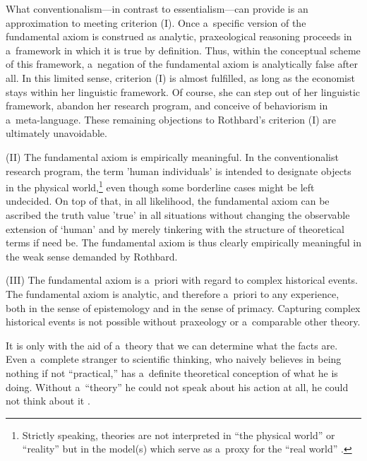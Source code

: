 What conventionalism---in contrast to essentialism---can provide is an approximation to meeting criterion (I). Once a~specific version of the fundamental axiom is construed as analytic, praxeological reasoning proceeds in a~framework in which it is true by definition. Thus, within the conceptual scheme of this framework, a~negation of the fundamental axiom is analytically false after all. In this limited sense, criterion (I) is almost fulfilled, as long as the economist stays within her linguistic framework. Of course, she can step out of her linguistic framework, abandon her research program, and conceive of behaviorism in a~meta-language. These remaining objections to Rothbard's criterion (I) are ultimately unavoidable.



(II) The fundamental axiom is empirically meaningful. In the conventionalist research program, the term 'human individuals' is intended to designate objects in the physical world,\footnote{Strictly speaking, theories are not interpreted in ``the physical world'' or ``reality'' but in the model(s) which serve as a~proxy for the ``real world'' 
\parencites[cf.][]{linsbichler_ultra-refined_2023}[][]{przelecki_logic_1969}.%
} even though some borderline cases might be left undecided. On top of that, in all likelihood, the fundamental axiom can be ascribed the truth value 'true' in all situations without changing the observable extension of ‘human' and by merely tinkering with the structure of theoretical terms if need be. The fundamental axiom is thus clearly empirically meaningful in the weak sense demanded by Rothbard.



(III) The fundamental axiom is a~priori with regard to complex historical events. The fundamental axiom is analytic, and therefore a~priori to any experience, both in the sense of epistemology and in the sense of primacy. Capturing complex historical events is not possible without praxeology or a~comparable other theory.



It is only with the aid of a~theory that we can determine what the facts are. Even a~complete stranger to scientific thinking, who naively believes in being nothing if not ``practical,'' has a~definite theoretical conception of what he is doing. Without a~``theory'' he could not speak about his action at all, he could not think about it 
\parencite[][p.29]{mises_epistemological_2003}.%




